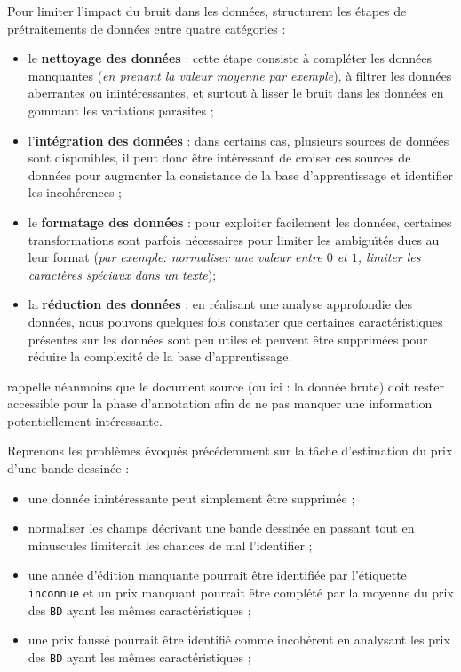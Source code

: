 			Pour limiter l'impact du bruit dans les données, \cite{alasadi-bhaya:2017:review-data-preprocessing} structurent les étapes de prétraitements de données entre quatre catégories :
			\begin{itemize}
				\item le \textbf{nettoyage des données} : cette étape consiste à compléter les données manquantes (\textit{en prenant la valeur moyenne par exemple}), à filtrer les données aberrantes ou inintéressantes, et surtout à lisser le bruit dans les données en gommant les variations parasites ;
				\item l'\textbf{intégration des données} : dans certains cas, plusieurs sources de données sont disponibles, il peut donc être intéressant de croiser ces sources de données pour augmenter la consistance de la base d'apprentissage et identifier les incohérences ;
				\item le \textbf{formatage des données} : pour exploiter facilement les données, certaines transformations sont parfois nécessaires pour limiter les ambiguïtés dues au leur format (\textit{par exemple: normaliser une valeur entre $0$ et $1$, limiter les caractères spéciaux dans un texte});
				\item la \textbf{réduction des données} : en réalisant une analyse approfondie des données, nous pouvons quelques fois constater que certaines caractéristiques présentes sur les données sont peu utiles et peuvent être supprimées pour réduire la complexité de la base d'apprentissage.
			\end{itemize}
			\cite{baledent:2022:complexite-annotation-manuelle} rappelle néanmoins que le document source (ou ici : la donnée brute) doit rester accessible pour la phase d'annotation afin de ne pas manquer une information potentiellement intéressante.
			\begin{leftBarExamples}
				Reprenons les problèmes évoqués précédemment sur la tâche d'estimation du prix d'une bande dessinée :
				\begin{itemize}
					\item une donnée inintéressante peut simplement être supprimée ;
					\item normaliser les champs décrivant une bande dessinée en passant tout en minuscules limiterait les chances de mal l'identifier ;
					\item une année d'édition manquante pourrait être identifiée par l'étiquette \texttt{inconnue} et un prix manquant pourrait être complété par la moyenne du prix des \texttt{BD} ayant les mêmes caractéristiques ;
					\item une prix faussé pourrait être identifié comme incohérent en analysant les prix des \texttt{BD} ayant les mêmes caractéristiques ;
				\end{itemize}
			\end{leftBarExamples}
